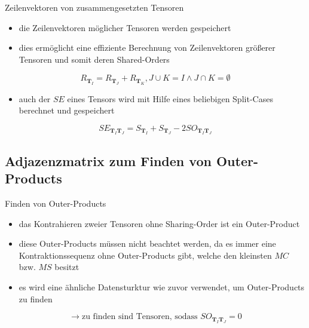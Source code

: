 \documentclass{beamer}
\begin{document}
\begin{frame}{Zeilenvektoren von zusammengesetzten Tensoren}
	\begin{itemize}
		\item die Zeilenvektoren möglicher Tensoren werden gespeichert
		\item dies ermöglicht eine effiziente Berechnung von Zeilenvektoren größerer Tensoren und somit deren Shared-Orders
	\end{itemize}
	\begin{equation*}
		R_{\bm{T}_I} = R_{\bm{T}_J} + R_{\bm{T}_K}, J \cup K = I \wedge J \cap K = \emptyset
	\end{equation*} \pause
	\begin{itemize}
		\item auch der $SE$ eines Tensors wird mit Hilfe eines beliebigen Split-Cases berechnet und gespeichert
	\end{itemize}
	\begin{equation*}
		SE_{\bm{T}_I \bm{T}_J} = S_{\bm{T}_{I}} + S_{\bm{T}_{J}} - 2SO_{\bm{T}_I \bm{T}_J}
	\end{equation*}
\end{frame}

\subsection{Adjazenzmatrix zum Finden von Outer-Products}
\begin{frame}{Finden von Outer-Products}
	\begin{itemize}
		\item das Kontrahieren zweier Tensoren ohne Sharing-Order ist ein Outer-Product
		\item diese Outer-Products müssen nicht beachtet werden, da es immer eine Kontraktionssequenz ohne Outer-Products gibt, welche den kleinsten $MC$ bzw. $MS$ besitzt\cite{outerProduct}
		\item es wird eine ähnliche Datensturktur wie zuvor verwendet, um Outer-Products zu finden
	\end{itemize} \pause
	\begin{equation*}
		\rightarrow \text{zu finden sind Tensoren, sodass } SO_{\bm{T}_I \bm{T}_J} = 0
	\end{equation*}
\end{frame}
\end{document}

